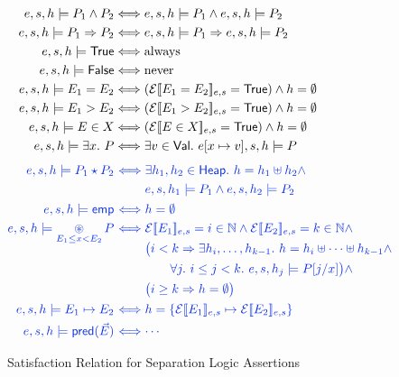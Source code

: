 \documentclass[11pt]{article}
\newcommand{\True}{\mathsf{True}}
\newcommand{\False}{\mathsf{False}}
\newcommand{\Emp}{\mathsf{emp}}
\newcommand{\Eval}[1]{\mathcal{E}[\![#1]\!]_{e,s}}
\newcommand{\Val}{\mathsf{Val}}
\newcommand{\Heap}{\mathsf{Heap}}
\newcommand{\Pred}{\mathsf{pred}}
\begin{document}
\begin{figure}      
\begin{align*}
e, s, h \models P_1 \land P_2
  &\Longleftrightarrow e, s, h \models P_1 \land e, s, h \models P_2 \\
e, s, h \models P_1 \Rightarrow P_2
  &\Longleftrightarrow e, s, h \models P_1 \Rightarrow e, s, h \models P_2 \\
e, s, h \models \True
  &\Longleftrightarrow \text{always} \\
e, s, h \models \False
  &\Longleftrightarrow \text{never} \\
e, s, h \models E_1 = E_2
  &\Longleftrightarrow (\Eval{E_1 = E_2} = \True) \land h = \emptyset \\
e, s, h \models E_1 > E_2
  &\Longleftrightarrow (\Eval{E_1 > E_2} = \True) \land h = \emptyset \\
e, s, h \models E \in X
  &\Longleftrightarrow (\Eval{E \in X} = \True) \land h = \emptyset \\
e, s, h \models \exists x.\ P
  &\Longleftrightarrow \exists v \in \Val.\ e[x \mapsto v], s, h \models P \\[1ex]
{\color{blue} e, s, h \models P_1 \star P_2}
  &{\color{blue}\ \Longleftrightarrow \begin{aligned}[t]
    & \exists h_1, h_2 \in \Heap.\ h = h_1 \uplus h_2 \land \\
    & e, s, h_1 \models P_1 \land e, s, h_2 \models P_2
    \end{aligned}} \\
{\color{blue} e, s, h \models \Emp}
  &{\color{blue}\ \Longleftrightarrow h = \emptyset} \\
{\color{blue} e, s, h \models \displaystyle\mathop{\circledast}_{E_1 \le x < E_2} P}
  &{\color{blue}\ \Longleftrightarrow \begin{aligned}[t]
    & \Eval{E_1} = i \in \mathbb{N}
      \land \Eval{E_2} = k \in \mathbb{N} \land \\
    & \bigl(i < k \Rightarrow
      \exists h_i, \ldots, h_{k-1}.\ h = h_i \uplus \cdots \uplus h_{k-1}
      \land \\
    & \qquad \forall j.\ i \le j < k.\ e, s, h_j \models P[j/x]\bigr) \land \\
    & \bigl(i \ge k \Rightarrow h = \emptyset\bigr)
    \end{aligned}} \\
{\color{blue} e, s, h \models E_1 \mapsto E_2}
  &{\color{blue}\ \Longleftrightarrow h = \{\Eval{E_1} \mapsto \Eval{E_2}\}} \\
{\color{blue} e, s, h \models \Pred(\vec{E})}
  &{\color{blue}\ \Longleftrightarrow \cdots}
\end{align*}
\caption{Satisfaction Relation for Separation Logic Assertions}
\label{satisfaction}
\end{figure}
\end{document}
